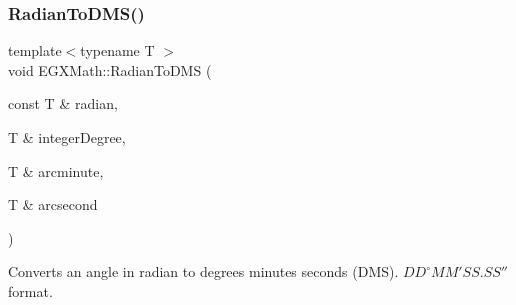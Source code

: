 \mbox{\label{group___e_g_x_math-_angle_conversions-_radian_gaf80be0c5c65ccaa5544a08a7754f3575}} 
\subsubsection{\texorpdfstring{Radian\+To\+D\+M\+S()}{RadianToDMS()}}
{\footnotesize\ttfamily template$<$typename T $>$ \\
void E\+G\+X\+Math\+::\+Radian\+To\+D\+MS (\begin{DoxyParamCaption}\item[{const T \&}]{radian,  }\item[{T \&}]{integer\+Degree,  }\item[{T \&}]{arcminute,  }\item[{T \&}]{arcsecond }\end{DoxyParamCaption})}



Converts an angle in radian to degrees minutes seconds (D\+MS). ${DD}^{\circ}{MM}'{SS.SS}''$ format. 

